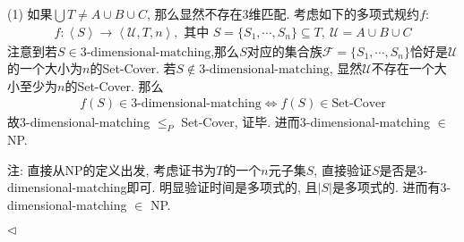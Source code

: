 \documentclass[11pt]{article}
\newenvironment{answer}[1][Answer]{\begin{trivlist}
\item[\hskip \labelsep{\bfseries\itshape#1.}\hskip \labelsep]}{\hfill$\lhd$\end{trivlist}}
\begin{document}
\begin{answer}
    (1) 如果$\bigcup T \neq A\cup B\cup C$, 那么显然不存在3维匹配. 考虑如下的多项式规约$f$:
    \begin{align*}
        f: \left\langle S \right\rangle \rightarrow \left\langle \mathcal{U}, T, n \right\rangle, \text{ 其中 } S = \{S_1, \cdots, S_n \} \subseteq T, ~\mathcal{U} = A\cup B\cup C
    \end{align*}
    注意到若$S \in \text{3-dimensional-matching}$,那么$S$对应的集合族$\mathcal{F} = \{S_1, \cdots, S_n\}$恰好是$\mathcal{U}$的一个大小为$n$的Set-Cover. 若$S \notin \text{3-dimensional-matching}$, 显然$\mathcal{U}$不存在一个大小至少为$n$的Set-Cover. 那么
    \begin{align*}
        f(S) \in \text{3-dimensional-matching} \iff f(S) \in \text{Set-Cover}
    \end{align*}
    故3-dimensional-matching $\leq_{P}$ Set-Cover, 证毕. 进而3-dimensional-matching $\in$ NP.

    注: 直接从NP的定义出发, 考虑证书为$T$的一个$n$元子集$S$, 直接验证$S$是否是3-dimensional-matching即可. 明显验证时间是多项式的, 且$|S|$是多项式的. 进而有3-dimensional-matching $\in$ NP.


\end{answer}
\end{document}
